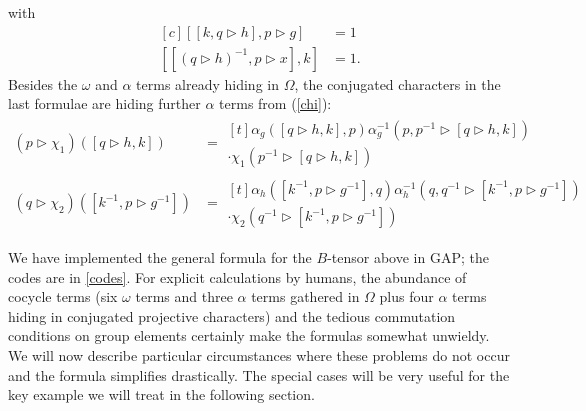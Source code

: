 \documentclass[11pt]{book}
\theoremstyle{Rem}
\theoremstyle{definition}
\numberwithin{equation}{section}
\newcommand\hit{\triangleright}
\begin{document}
with
\begin{equation}
\label{eq:condition3}
\begin{aligned}[c]
 [[k, q\hit h], p\hit g] &= 1\\ 
 [[(q\hit h)^{-1}, p\hit x],k]&=1.
\end{aligned}
\end{equation}
Besides the $\omega$ and $\alpha$ terms already hiding in $\Omega$, the conjugated characters in the last formulae are hiding further $\alpha$ terms from (\cref{chi}):
\begin{align*}
  (p\hit \chi_{1})([q\hit h, k]) &=\begin{aligned}[t]\alpha_{g} ([q\hit h, k], p) \alpha^{-1}_{g}(p, p^{-1} \hit [q\hit h, k])\\\cdot\chi_1(p^{-1} \hit [q\hit h, k])&
  \end{aligned}
  \\
(q\hit \chi_{2})([k^{-1}, p\hit g^{-1}])&=\begin{aligned}[t] \alpha_{h}([k^{-1}, p\hit g^{-1}],q) \alpha^{-1}_{h} (q, q^{-1} \hit [k^{-1}, p\hit g^{-1}])&\\\cdot\chi_2(q^{-1}\hit[k^{-1}, p\hit g^{-1}])&
\end{aligned}
\end{align*}


We have implemented the general formula for the $B$-tensor above in GAP; the codes are in \cref{codes}. For explicit calculations by humans, the abundance of cocycle terms (six $\omega$ terms and three $\alpha$ terms gathered in $\Omega$ plus four $\alpha$ terms hiding in conjugated projective characters) and the tedious commutation conditions on group elements certainly make the formulas somewhat unwieldy. We will now describe particular circumstances where these problems do not occur and the formula simplifies drastically. The special cases will be very useful for the key example we will treat in the following section.
\end{document}
